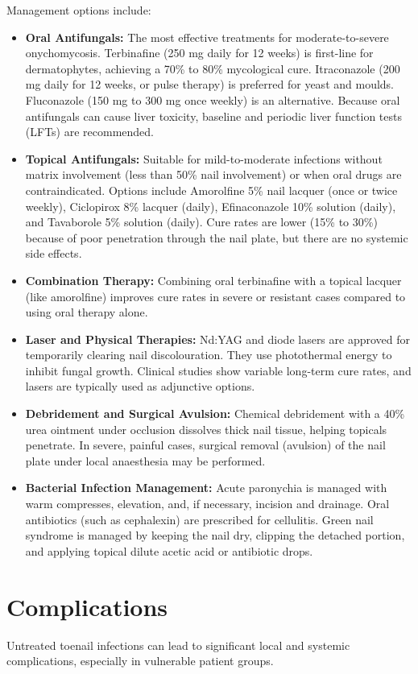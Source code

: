 Management options include:
\begin{itemize}
    \item \textbf{Oral Antifungals:} The most effective treatments for moderate-to-severe onychomycosis. Terbinafine (250 mg daily for 12 weeks) is first-line for dermatophytes, achieving a 70\% to 80\% mycological cure. Itraconazole (200 mg daily for 12 weeks, or pulse therapy) is preferred for yeast and moulds. Fluconazole (150 mg to 300 mg once weekly) is an alternative. Because oral antifungals can cause liver toxicity, baseline and periodic liver function tests (LFTs) are recommended.
    \item \textbf{Topical Antifungals:} Suitable for mild-to-moderate infections without matrix involvement (less than 50\% nail involvement) or when oral drugs are contraindicated. Options include Amorolfine 5\% nail lacquer (once or twice weekly), Ciclopirox 8\% lacquer (daily), Efinaconazole 10\% solution (daily), and Tavaborole 5\% solution (daily). Cure rates are lower (15\% to 30\%) because of poor penetration through the nail plate, but there are no systemic side effects.
    \item \textbf{Combination Therapy:} Combining oral terbinafine with a topical lacquer (like amorolfine) improves cure rates in severe or resistant cases compared to using oral therapy alone.
    \item \textbf{Laser and Physical Therapies:} Nd:YAG and diode lasers are approved for temporarily clearing nail discolouration. They use photothermal energy to inhibit fungal growth. Clinical studies show variable long-term cure rates, and lasers are typically used as adjunctive options.
    \item \textbf{Debridement and Surgical Avulsion:} Chemical debridement with a 40\% urea ointment under occlusion dissolves thick nail tissue, helping topicals penetrate. In severe, painful cases, surgical removal (avulsion) of the nail plate under local anaesthesia may be performed.
    \item \textbf{Bacterial Infection Management:} Acute paronychia is managed with warm compresses, elevation, and, if necessary, incision and drainage. Oral antibiotics (such as cephalexin) are prescribed for cellulitis. Green nail syndrome is managed by keeping the nail dry, clipping the detached portion, and applying topical dilute acetic acid or antibiotic drops.
\end{itemize}

\section*{Complications}
Untreated toenail infections can lead to significant local and systemic complications, especially in vulnerable patient groups.

